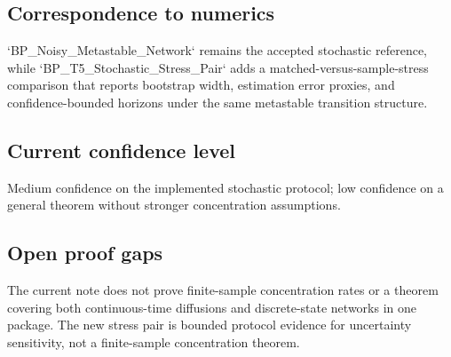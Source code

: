 \subsection{Correspondence to numerics}
`BP_Noisy_Metastable_Network` remains the accepted stochastic reference, while `BP_T5_Stochastic_Stress_Pair` adds a matched-versus-sample-stress comparison that reports bootstrap width, estimation error proxies, and confidence-bounded horizons under the same metastable transition structure.

\subsection{Current confidence level}
Medium confidence on the implemented stochastic protocol; low confidence on a general theorem without stronger concentration assumptions.

\subsection{Open proof gaps}
The current note does not prove finite-sample concentration rates or a theorem covering both continuous-time diffusions and discrete-state networks in one package. The new stress pair is bounded protocol evidence for uncertainty sensitivity, not a finite-sample concentration theorem.
